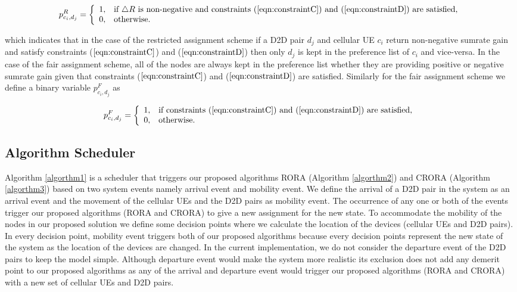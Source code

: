 \documentclass[times]{dacauth}
\begin{document}
\[ p_{c_i,d_j}^{R} = \left\{ \begin{array}{ll}
         1, & \mbox{if $\triangle R$ is non-negative and constraints ($\ref{eqn:constraintC}$) and ($\ref{eqn:constraintD}$) are satisfied,}\\
         0, & \mbox{otherwise}.\end{array} \right. \]

\noindent         
which indicates that in the case of the restricted assignment scheme if a D2D pair $d_j$ and cellular UE $c_i$ return non-negative sumrate gain and satisfy constraints ($\ref{eqn:constraintC}$) and ($\ref{eqn:constraintD}$) then only  $d_j$ is kept in the preference list of $c_i$ and vice-versa.        
\noindent
In the case of the fair assignment scheme, all of the nodes are always kept in the preference list whether they are providing positive or negative sumrate gain given that constraints ($\ref{eqn:constraintC}$) and ($\ref{eqn:constraintD}$) are satisfied. Similarly for the fair assignment scheme we define a binary variable $p_{c_i,d_j}^{F}$ as  

\[ p_{c_i,d_j}^{F} = \left\{ \begin{array}{ll}
         1, & \mbox{if constraints  ($\ref{eqn:constraintC}$) and ($\ref{eqn:constraintD}$) are satisfied,}\\
         0, & \mbox{otherwise}.\end{array} \right. \]  
 

\smallskip


\subsection{Algorithm Scheduler}
\smallskip
\noindent
Algorithm \ref{algorthm1} is a scheduler that triggers our proposed algorithms RORA (Algorithm \ref{algorthm2}) and CRORA (Algorithm \ref{algorthm3}) based on two system events namely arrival event and mobility event. We define the arrival of a D2D pair in the system as an arrival event and the movement of the cellular UEs and the D2D pairs as mobility event. The occurrence of any one or both of the events trigger our proposed algorithms (RORA and CRORA) to give a new assignment for the new state. To accommodate the mobility of the nodes in our proposed solution we define some decision points where we calculate the location of the devices (cellular UEs and D2D pairs). In every decision point, mobility event triggers both of our proposed algorithms because every decision points represent the new state of the system as the location of the devices are changed. In the current implementation, we do not consider the departure event of the D2D pairs to keep the model simple. Although departure event would make the system more realistic its exclusion does not add any demerit point to our proposed algorithms as any of the arrival and departure event would trigger our proposed algorithms (RORA and CRORA) with a new set of cellular UEs and D2D pairs.
\end{document}
